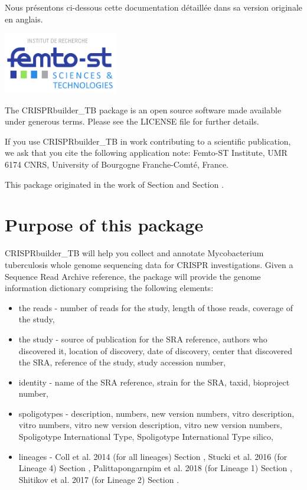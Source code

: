 \documentclass[twoside,a4paper,11pt,frenchb,openany]{report}
\begin{document}
Nous présentons ci-dessous cette documentation détaillée dans sa version originale en anglais.

\includegraphics[width=5cm]{femto.png}

The CRISPRbuilder\_TB package is an open source software made available
under generous terms. Please see the LICENSE file for further details.

If you use CRISPRbuilder\_TB in work contributing to a scientific
publication, we ask that you cite the following application note:
Femto-ST Institute, UMR 6174 CNRS, University of Bourgogne
Franche-Comté, France.

This package originated in the work of Section \cite{guyeux1} and
Section \cite{guyeux2}.



    \section{Purpose of this package}\label{purpose-of-this-package}

    CRISPRbuilder\_TB will help you collect and annotate Mycobacterium
tuberculosis whole genome sequencing data for CRISPR investigations.
Given a Sequence Read Archive reference, the package will provide the
genome information dictionary comprising the following elements:

\begin{itemize}
\item
  the reads - number of reads for the study, length of those reads,
  coverage of the study,
\item
  the study - source of publication for the SRA reference, authors who
  discovered it, location of discovery, date of discovery, center that
  discovered the SRA, reference of the study, study accession number,
\item
  identity - name of the SRA reference, strain for the SRA, taxid,
  bioproject number,
\item
  spoligotypes - description, numbers, new version numbers, vitro
  description, vitro numbers, vitro new version description, vitro new
  version numbers, Spoligotype International Type, Spoligotype
  International Type silico,
\item
  lineages - Coll et al. 2014 (for all lineages) Section \cite{coll-preston},
  Stucki et al. 2016 (for Lineage 4) Section \cite{stucki-brites},
  Palittapongarnpim et al. 2018 (for Lineage 1) Section \cite{pali-ajaw},
  Shitikov et al. 2017 (for Lineage 2) Section \cite{shiti-kolchenko}.
\end{itemize}
\end{document}
